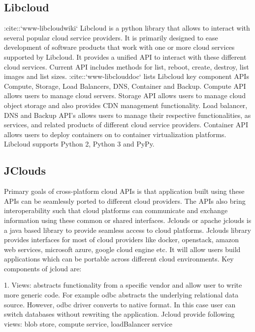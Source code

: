 \subsection{Libcloud}

     :cite::`www-libcloudwiki` Libcloud is a python library that
     allows to interact with several popular cloud service
     providers. It is primarily designed to ease development of
     software products that work with one or more cloud services
     supported by Libcloud. It provides a unified API to interact with
     these different cloud services. Current API includes methods for
     list, reboot, create, destroy, list images and list
     sizes. :cite::`www-libclouddoc` lists Libcloud key component APIs
     Compute, Storage, Load Balancers, DNS, Container and
     Backup. Compute API allows users to manage cloud servers. Storage
     API allows users to manage cloud object storage and also provides
     CDN management functionality. Load balancer, DNS and Backup API’s
     allows users to manage their respective functionalities, as
     services, and related products of different cloud service
     providers. Container API allows users to deploy containers on to
     container virtualization platforms. Libcloud supports Python 2,
     Python 3 and PyPy.
     
\subsection{JClouds}

     \cite{cloud-portability-book} Primary goals of cross-platform
     cloud APIs is that application built using these APIs can be
     seamlessly ported to different cloud providers. The APIs also
     bring interoperability such that cloud platforms can communicate
     and exchange information using these common or shared interfaces.
     Jclouds or apache jclouds \cite{www-jclouds} is a java based
     library to provide seamless access to cloud platforms. Jclouds
     library provides interfaces for most of cloud providers like
     docker, openstack, amazon web services, microsoft azure, google
     cloud engine etc. It will allow users build applications which
     can be portable across different cloud environments.  Key
     components of jcloud are:

     1. Views: abstracts functionality from a specific vendor and
        allow user to write more generic code. For example odbc
        abstracts the underlying relational data source. However, odbc
        driver converts to native format. In this case user can switch
        databases without rewriting the application. Jcloud provide
        following views: blob store, compute service, loadBalancer
        service

